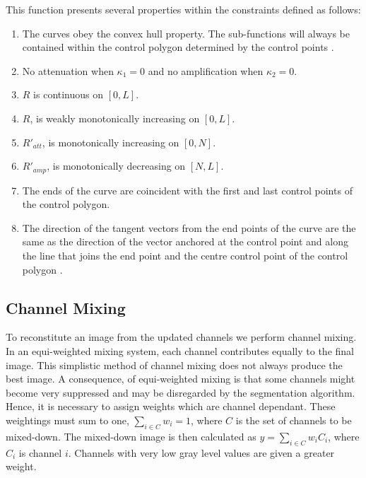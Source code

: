 \begin{definition}
This function presents several properties within the constraints defined as follows:
\begin{enumerate}
	\item
	The curves obey the convex hull property. The sub-functions will always be contained within the control polygon determined by the control points \citep{Vince2006,Marsh2005}.
	
	\item
	No attenuation when $\kappa_1=0$ and no amplification when $\kappa_2=0$.
	
	\item
	$R$ is continuous on $[0,L]$.
	
	\item
	$R$, is weakly monotonically increasing on $[0,L]$.
	
	\item
	$R'_{att}$, is monotonically increasing on $[0, N]$.
	
	\item
	$R'_{amp}$, is monotonically decreasing on $[N, L]$.
	
	\item
	The ends of the curve are coincident with the first and last control points of the control polygon.
	
	\item
	The direction of the tangent vectors from the end points of the curve are the same as the direction of the vector anchored at the control point and along the line that joins the end point and the centre control point of the control polygon \citep{Vince2006,Marsh2005}.
\end{enumerate}
\end{definition}



\subsection{Channel Mixing}
\label{sec:channelmixing}

To reconstitute an image from the updated channels we perform channel mixing. In an equi-weighted mixing system, each channel contributes equally to the final image. This simplistic method of channel mixing does not always produce the best image.
A consequence, of equi-weighted mixing is that some channels might become very suppressed and may be disregarded by the segmentation algorithm. Hence, it is necessary to assign weights which are channel dependant. These weightings must sum to one, $\sum_{i \in C} w_i = 1$, where $C$ is the set of channels to be mixed-down. The mixed-down image is then calculated as $y = \sum_{i \in C}w_iC_i$, where $C_i$ is channel $i$. Channels with very low gray level values are given a greater weight.

